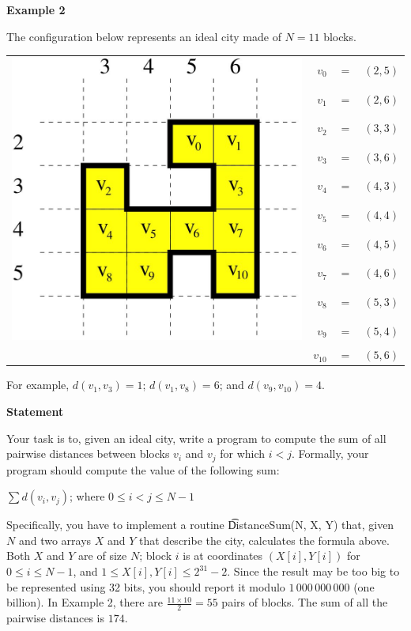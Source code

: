 \bf{Example 2}

The configuration below represents an ideal city made of $N = 11$ blocks.

\begin{tabular}{crcl}
\multirow{10}{*}{\includegraphics[height = 27ex]{2012-4-02.jpg}}& 
$v_0$ &$=$& $(2,5)$\\
&$v_1$ &$=$& $(2,6)$\\
&$v_2$ &$=$& $(3,3)$\\
&$v_3$ &$=$& $(3,6)$\\
&$v_4$ &$=$& $(4,3)$\\
&$v_5$ &$=$& $(4,4)$\\
&$v_6$ &$=$& $(4,5)$\\
&$v_7$ &$=$& $(4,6)$\\
&$v_8$ &$=$& $(5,3)$\\
&$v_9$ &$=$& $(5,4)$\\
&$v_{10}$ &$=$& $(5,6)$\\
\end{tabular}

For example, $d(v_1, v_3) = 1$; $d(v_1, v_8) = 6$; and $d(v_9, v_{10}) = 4$.

\bf{Statement}

Your task is to, given an ideal city, write a program to compute the sum of all pairwise distances between blocks $v_i$ and $v_j$ for which $i < j$. Formally, your program should compute the value of the following sum: 

\begin{center}
$\sum d(v_i, v_j)$; where $0 \le i < j \le N-1$
\end{center}

Specifically, you have to implement a routine \t{DistanceSum(N, X, Y)} that, given $N$ and two arrays $X$ and $Y$ that describe the city, calculates the formula above. Both $X$ and $Y$ are of size $N$; block $i$ is at coordinates $(X[i], Y[i])$ for $0 \le i \le N - 1$, and $1 \le X[i], Y[i] \le 2^{31} - 2$. Since the result may be too big to be represented using 32 bits, you should report it modulo $1\,000\,000\,000$ (one billion). In Example 2, there are $\frac{11 × 10}{2} = 55$ pairs of blocks. The sum of all the pairwise distances is $174$.

